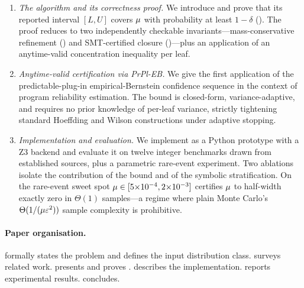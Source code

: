 \begin{enumerate}
\item \emph{The \toolname{} algorithm and its correctness proof.}  We
  introduce \toolname{} and prove that its reported interval $[L,U]$
  covers $\mu$ with probability at least $1-\delta$
  ().  The proof reduces to two independently
  checkable invariants---mass-conservative refinement
  () and SMT-certified closure
  ()---plus an application of an
  anytime-valid concentration inequality per leaf.

\item \emph{Anytime-valid certification via PrPl-EB.}  We give the
  first application of the predictable-plug-in empirical-Bernstein
  confidence sequence in the context of program reliability
  estimation.  The bound is closed-form, variance-adaptive, and
  requires no prior knowledge of per-leaf variance, strictly
  tightening standard Hoeffding and Wilson constructions under
  adaptive stopping.

\item \emph{Implementation and evaluation.}  We implement \toolname{}
  as a Python prototype with a Z3 backend and evaluate it on
  twelve integer benchmarks drawn from established sources, plus a
  parametric rare-event experiment.  Two ablations isolate the
  contribution of the bound and of the symbolic stratification.  On
  the rare-event sweet spot $\mu \in [5{\times}10^{-4}, 2{\times}10^{-3}]$
  \toolname{} certifies $\mu$ to half-width exactly zero in
  $\Theta(1)$ samples---a regime where plain Monte Carlo's
  $\Theta(1/(\mu\varepsilon^2))$ sample complexity is prohibitive.
\end{enumerate}

\paragraph{Paper organisation.}
 formally states the problem and defines the input
distribution class.   surveys related work.
 presents \toolname{} and proves
.   describes the
\toolname{} implementation.   reports experimental
results.   concludes.
